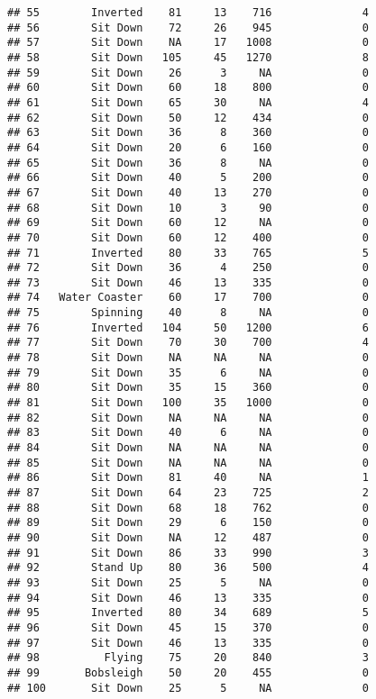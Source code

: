 \documentclass[
]{article}
\begin{document}
\begin{verbatim}
## 55        Inverted    81     13    716              4
## 56        Sit Down    72     26    945              0
## 57        Sit Down    NA     17   1008              0
## 58        Sit Down   105     45   1270              8
## 59        Sit Down    26      3     NA              0
## 60        Sit Down    60     18    800              0
## 61        Sit Down    65     30     NA              4
## 62        Sit Down    50     12    434              0
## 63        Sit Down    36      8    360              0
## 64        Sit Down    20      6    160              0
## 65        Sit Down    36      8     NA              0
## 66        Sit Down    40      5    200              0
## 67        Sit Down    40     13    270              0
## 68        Sit Down    10      3     90              0
## 69        Sit Down    60     12     NA              0
## 70        Sit Down    60     12    400              0
## 71        Inverted    80     33    765              5
## 72        Sit Down    36      4    250              0
## 73        Sit Down    46     13    335              0
## 74   Water Coaster    60     17    700              0
## 75        Spinning    40      8     NA              0
## 76        Inverted   104     50   1200              6
## 77        Sit Down    70     30    700              4
## 78        Sit Down    NA     NA     NA              0
## 79        Sit Down    35      6     NA              0
## 80        Sit Down    35     15    360              0
## 81        Sit Down   100     35   1000              0
## 82        Sit Down    NA     NA     NA              0
## 83        Sit Down    40      6     NA              0
## 84        Sit Down    NA     NA     NA              0
## 85        Sit Down    NA     NA     NA              0
## 86        Sit Down    81     40     NA              1
## 87        Sit Down    64     23    725              2
## 88        Sit Down    68     18    762              0
## 89        Sit Down    29      6    150              0
## 90        Sit Down    NA     12    487              0
## 91        Sit Down    86     33    990              3
## 92        Stand Up    80     36    500              4
## 93        Sit Down    25      5     NA              0
## 94        Sit Down    46     13    335              0
## 95        Inverted    80     34    689              5
## 96        Sit Down    45     15    370              0
## 97        Sit Down    46     13    335              0
## 98          Flying    75     20    840              3
## 99       Bobsleigh    50     20    455              0
## 100       Sit Down    25      5     NA              0

\end{verbatim}
\end{document}
